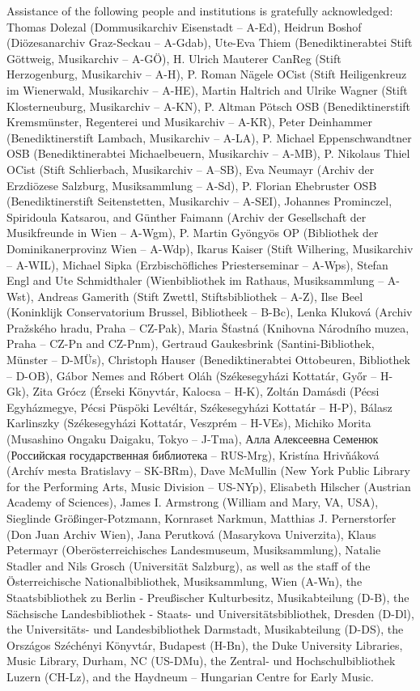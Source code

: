 \documentclass{ees}
\begin{document}
Assistance of the following people and institutions is gratefully acknowledged:
Thomas Dolezal (Dommusikarchiv Eisenstadt – A-Ed),
Heidrun Boshof (Diözesanarchiv Graz-Seckau – A-Gdab),
Ute-Eva Thiem (Benediktinerabtei Stift Göttweig, Musikarchiv – A-GÖ),
H. Ulrich Mauterer CanReg (Stift Herzogenburg, Musikarchiv – A-H),
P. Roman Nägele OCist (Stift Heiligenkreuz im Wienerwald, Musikarchiv – A-HE),
Martin Haltrich and Ulrike Wagner (Stift Klosterneuburg, Musikarchiv – A-KN),
P. Altman Pötsch OSB (Benediktinerstift Kremsmünster, Regenterei und Musikarchiv – A-KR),
Peter Deinhammer (Benediktinerstift Lambach, Musikarchiv – A-LA),
P. Michael Eppenschwandtner OSB (Benediktinerabtei Michaelbeuern, Musikarchiv – A-MB),
P. Nikolaus Thiel OCist (Stift Schlierbach, Musikarchiv – A–SB),
Eva Neumayr (Archiv der Erzdiözese Salzburg, Musiksammlung – A-Sd),
P. Florian Ehebruster OSB (Benediktinerstift Seitenstetten, Musikarchiv – A-SEI),
Johannes Prominczel, Spiridoula Katsarou, and Günther Faimann (Archiv der Gesellschaft der Musikfreunde in Wien – A-Wgm),
P. Martin Gyöngyös OP (Bibliothek der Dominikanerprovinz Wien – A-Wdp),
Ikarus Kaiser (Stift Wilhering, Musikarchiv – A-WIL),
Michael Sipka (Erzbischöfliches Priesterseminar – A-Wps),
Stefan Engl and Ute Schmidthaler (Wienbibliothek im Rathaus, Musiksammlung – A-Wst),
Andreas Gamerith (Stift Zwettl, Stiftsbibliothek – A-Z),
Ilse Beel (Koninklijk Conservatorium Brussel, Bibliotheek – B-Bc),
Lenka Kluková (Archiv Pražského hradu, Praha – CZ-Pak),
Maria Šťastná (Knihovna Národního muzea, Praha – CZ-Pn and CZ-Pnm),
Gertraud Gaukesbrink (Santini-Bibliothek, Münster – D-MÜs),
Christoph Hauser (Benediktinerabtei Ottobeuren, Bibliothek – D-OB),
Gábor Nemes and Róbert Oláh (Székesegyházi Kottatár, Győr – H-Gk),
Zita Grócz (Érseki Könyvtár, Kalocsa – H-K),
Zoltán Damásdi (Pécsi Egyházmegye, Pécsi Püspöki Levéltár, Székesegyházi Kottatár – H-P),
Bálasz Karlinszky (Székesegyházi Kottatár, Veszprém – H-VEs),
Michiko Morita (Musashino Ongaku Daigaku, Tokyo – J-Tma),
Алла Алексеевна Семенюк (Российская государственная библиотека – RUS-Mrg),
Kristína Hrivňáková (Archív mesta Bratislavy – SK-BRm),
Dave McMullin (New York Public Library for the Performing Arts, Music Division – US-NYp),
Elisabeth Hilscher (Austrian Academy of Sciences),
James I. Armstrong (William and Mary, VA, USA),
Sieglinde Größinger-Potzmann,
Kornraset Narkmun,
Matthias J. Pernerstorfer (Don Juan Archiv Wien),
Jana Perutková (Masarykova Univerzita),
Klaus Petermayr (Oberösterreichisches Landesmuseum, Musiksammlung),
Natalie Stadler and Nils Grosch (Universität Salzburg),
as well as the staff of
the Österreichische Nationalbibliothek, Musiksammlung, Wien (A-Wn),
the Staatsbibliothek zu Berlin - Preußischer Kulturbesitz, Musikabteilung (D-B),
the Sächsische Landesbibliothek - Staats- und Universitätsbibliothek, Dresden (D-Dl),
the Universitäts- und Landesbibliothek Darmstadt, Musikabteilung (D-DS),
the Országos Széchényi Könyvtár, Budapest (H-Bn),
the Duke University Libraries, Music Library, Durham, NC (US-DMu),
the Zentral- und Hochschulbibliothek Luzern (CH-Lz),
and the Haydneum – Hungarian Centre for Early Music.


\clearpage
{}
\end{document}

